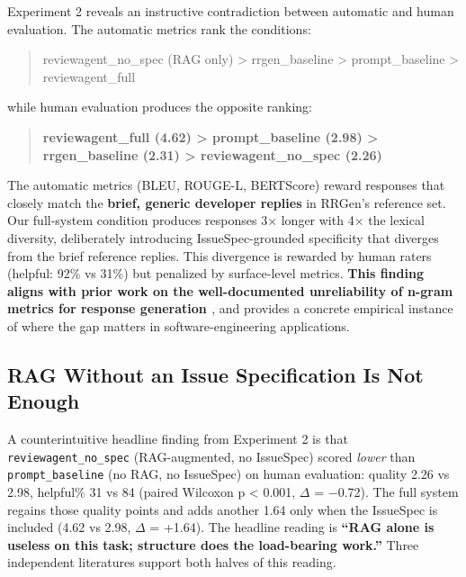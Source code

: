 \documentclass[sigconf, nonacm, anonymous, balance=false]{acmart}
\begin{document}
Experiment 2 reveals an instructive contradiction between automatic and human evaluation. The automatic metrics rank the conditions:

\begin{quote}
reviewagent\_no\_spec (RAG only) \textgreater{} rrgen\_baseline \textgreater{} prompt\_baseline \textgreater{} reviewagent\_full
\end{quote}

while human evaluation produces the opposite ranking:

\begin{quote}
\textbf{reviewagent\_full (4.62) \textgreater{} prompt\_baseline (2.98) \textgreater{} rrgen\_baseline (2.31) \textgreater{} reviewagent\_no\_spec (2.26)}
\end{quote}

The automatic metrics (BLEU, ROUGE-L, BERTScore) reward responses that closely match the \textbf{brief, generic developer replies} in RRGen's reference set. Our full-system condition produces responses 3$\times$ longer with 4$\times$ the lexical diversity, deliberately introducing IssueSpec-grounded specificity that diverges from the brief reference replies. This divergence is rewarded by human raters (helpful: 92\% vs 31\%) but penalized by surface-level metrics. \textbf{This finding aligns with prior work on the well-documented unreliability of n-gram metrics for response generation \cite{liu2016how, sai2022survey}}, and provides a concrete empirical instance of where the gap matters in software-engineering applications.

\subsection{RAG Without an Issue Specification Is Not Enough}\label{rag-without-an-issue-specification-is-not-enough}

A counterintuitive headline finding from Experiment 2 is that \texttt{reviewagent\_no\_spec} (RAG-augmented, no IssueSpec) scored \emph{lower} than \texttt{prompt\_baseline} (no RAG, no IssueSpec) on human evaluation: quality 2.26 vs 2.98, helpful\% 31 vs 84 (paired Wilcoxon p \textless{} 0.001, $\Delta$ = −0.72). The full system regains those quality points and adds another 1.64 only when the IssueSpec is included (4.62 vs 2.98, $\Delta$ = +1.64). The headline reading is \textbf{``RAG alone is useless on this task; structure does the load-bearing work.''} Three independent literatures support both halves of this reading.
\end{document}
